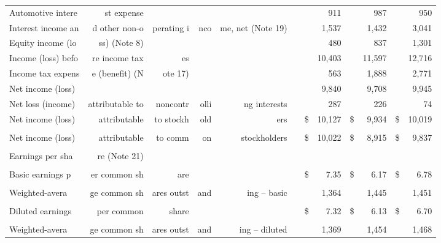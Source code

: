 \documentclass{article}
\begin{document}
\begin{table}[ht]
\begin{tabular}{lrrrrrrrrrrr}
Automotive intere & st expense &  &  &  &  &  & 911 &  & 987 &  & 950 \\
Interest income an & d other non-o & perating i & nco & me, net (Note 19) &  &  & 1,537 &  & 1,432 &  & 3,041 \\
Equity income (lo & ss) (Note 8) &  &  &  &  &  & 480 &  & 837 &  & 1,301 \\
Income (loss) befo & re income tax & es &  &  &  &  & 10,403 &  & 11,597 &  & 12,716 \\
Income tax expens & e (benefit) (N & ote 17) &  &  &  &  & 563 &  & 1,888 &  & 2,771 \\
Net income (loss) &  &  &  &  &  &  & 9,840 &  & 9,708 &  & 9,945 \\
Net loss (income) & attributable to & noncontr & olli & ng interests &  &  & 287 &  & 226 &  & 74 \\
Net income (loss) & attributable & to stockh & old & ers &  & \$ & 10,127 & \$ & 9,934 & \$ & 10,019 \\
 &  &  &  &  &  &  &  &  &  &  &  \\
Net income (loss) & attributable & to comm & on & stockholders &  & \$ & 10,022 & \$ & 8,915 & \$ & 9,837 \\
 &  &  &  &  &  &  &  &  &  &  &  \\
Earnings per sha & re (Note 21) &  &  &  &  &  &  &  &  &  &  \\
 &  &  &  &  &  &  &  &  &  &  &  \\
Basic earnings p & er common sh & are &  &  &  & \$ & 7.35 & \$ & 6.17 & \$ & 6.78 \\
 &  &  &  &  &  &  &  &  &  &  &  \\
Weighted-avera & ge common sh & ares outst & and & ing – basic &  &  & 1,364 &  & 1,445 &  & 1,451 \\
 &  &  &  &  &  &  &  &  &  &  &  \\
Diluted earnings & per common & share &  &  &  & \$ & 7.32 & \$ & 6.13 & \$ & 6.70 \\
 &  &  &  &  &  &  &  &  &  &  &  \\
Weighted-avera & ge common sh & ares outst & and & ing – diluted &  &  & 1,369 &  & 1,454 &  & 1,468 \\
\bottomrule
\end{tabular}
\end{table}

\newpage
\end{document}

